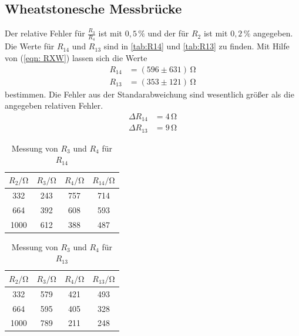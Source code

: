 \documentclass[
  bibliography=totoc,     %
  captions=tableheading,  %
  titlepage=firstiscover, %
]{scrartcl}
\begin{document}
  \subsection{Wheatstonesche Messbrücke}

  Der relative Fehler für $\frac{R_3}{R_4}$ ist mit $0,5\,\%$ und der für $R_2$ ist mit $0,2\,\%$ angegeben. Die Werte für $R_{14}$ und $R_{13}$ sind in
  \autoref{tab:R14} und \autoref{tab:R13} zu finden. Mit Hilfe von (\autoref{eqn: RXW}) lassen sich die Werte
  \begin{align*}
    R_{14} &= ( 596\pm 631)\,\unit{\ohm} \\
    R_{13} &= ( 353\pm 121)\,\unit{\ohm}
  \end{align*}
  bestimmen. Die Fehler aus der Standarabweichung sind wesentlich größer als die angegeben relativen Fehler.
  \begin{align*}
    \Delta R_{14} &= 4\,\unit{\ohm} \\
    \Delta R_{13} &= 9\,\unit{\ohm}
  \end{align*}

  \begin{table}[h]
    \centering
    \caption{Messung von $R_3$ und $R_4$ für $R_{14}$}
    \label{tab:R14}
    \begin{tabular}{c c c c}
      \toprule
      $R_2/\unit{\ohm}$ & $R_3/\unit{\ohm}$ & $R_4/\unit{\ohm}$ & $R_{14}/\unit{\ohm}$ \\
      \midrule
      332 & 243 & 757 &  714 \\
      664 & 392 & 608 &  593 \\
      1000 & 612 & 388 & 487 \\
      \bottomrule
    \end{tabular}
  \end{table}
  

  \begin{table}[h]
    \centering
    \caption{Messung von $R_3$ und $R_4$ für $R_{13}$}
    \label{tab:R13}
    \begin{tabular}{c c c c}
      \toprule
      $R_2/\unit{\ohm}$ & $R_3/\unit{\ohm}$ & $R_4/\unit{\ohm}$ & $R_{13}/\unit{\ohm}$ \\
      \midrule
      332 & 579 & 421 &  493 \\
      664 & 595 & 405 &  328 \\
      1000 & 789 & 211 & 248 \\
      \bottomrule
    \end{tabular}
  \end{table}
  \FloatBarrier
\end{document}
